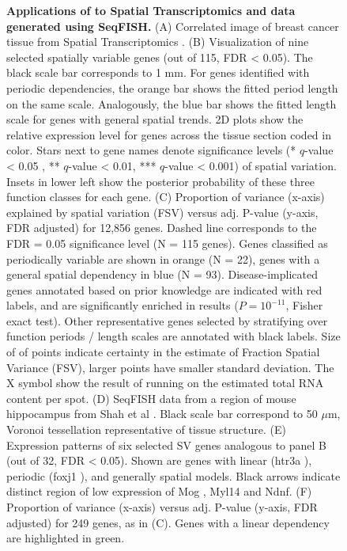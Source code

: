 \begin{figure} [t!]
    \caption[Applications of  to Spatial Transcriptomics and data generated using SeqFISH]{\textbf{Applications of  to Spatial Transcriptomics and data generated using SeqFISH.} (A) Correlated image of breast cancer tissue from Spatial Transcriptomics \cite{Stahl2016-ym}. (B) Visualization of nine selected spatially variable genes (out of 115, FDR < 0.05). The black scale bar corresponds to 1 mm. For genes identified with periodic dependencies, the orange bar shows the fitted period length on the same scale. Analogously, the blue bar shows the fitted length scale for genes with general spatial trends. 2D plots show the relative expression level for genes across the tissue section coded in color. Stars next to gene names denote significance levels (* \( q \)-value < 0.05 , ** \( q \)-value < 0.01, *** \( q \)-value < 0.001) of spatial variation. Insets in lower left show the posterior probability of these three function classes for each gene. (C) Proportion of variance (x-axis) explained by spatial variation (FSV) versus adj. P-value (y-axis, FDR adjusted) for 12,856 genes. Dashed line corresponds to the FDR = 0.05 significance level (N = 115 genes). Genes classified as periodically variable are shown in orange (N = 22), genes with a general spatial dependency in blue (N = 93). Disease-implicated genes annotated based on prior knowledge \cite{Stahl2016-ym} are indicated with red labels, and are significantly enriched in  results (\( P = 10^{-11} \), Fisher exact test). Other representative genes selected by stratifying over function periods / length scales are annotated with black labels. Size of of points indicate certainty in the estimate of Fraction Spatial Variance (FSV), larger points have smaller standard deviation. The X symbol show the result of running  on the estimated total RNA content per spot. (D) SeqFISH data from a region of mouse hippocampus from Shah et al \cite{Shah2016-bi}. Black scale bar correspond to 50 \( \mu \)m, Voronoi tessellation representative of tissue structure. (E) Expression patterns of six selected SV genes analogous to panel B (out of 32, FDR < 0.05). Shown are genes with linear (htr3a ), periodic (foxj1 ), and generally spatial models. Black arrows indicate distinct region of low expression of  Mog ,  Myl14  and  Ndnf. (F) Proportion of variance (x-axis) versus adj. P-value (y-axis, FDR adjusted) for 249 genes, as in (C). Genes with a linear dependency are highlighted in green.}
\end{figure}

